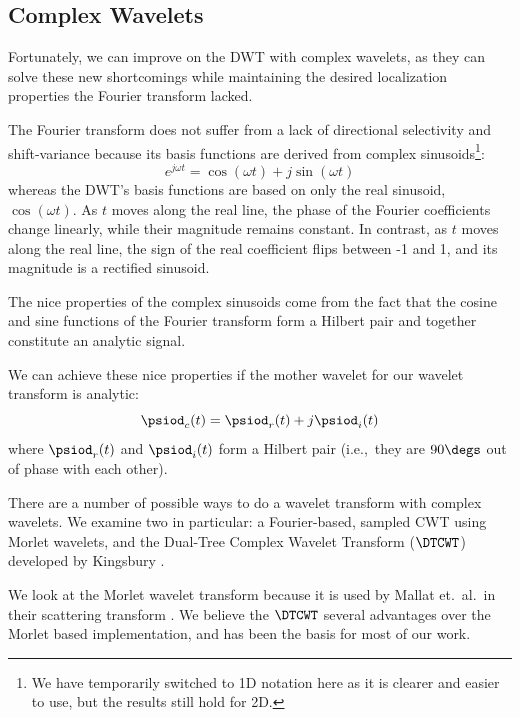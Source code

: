 \subsection{Complex Wavelets}\label{sec:ch2:complex_wavelets}
  Fortunately, we can improve on the DWT with complex wavelets, as they can
  solve these new shortcomings while maintaining the desired localization
  properties the Fourier transform lacked.

  The Fourier transform does not suffer from a lack of directional selectivity
  and shift-variance because its basis functions are derived from complex
  sinusoids\footnote{We have temporarily switched to 1D
  notation here as it is clearer and easier to use, but the results still hold
  for 2D.}:
  \begin{equation}
    e^{j\omega t} = \cos(\omega t) + j\sin(\omega t)
  \end{equation}
  whereas the DWT's basis functions are based on only the real
  sinusoid, $\cos(\omega t)$. As $t$ moves along the real line, the phase of the
  Fourier coefficients change linearly, while their magnitude remains constant. In
  contrast, as $t$ moves along the real line, the sign of the real coefficient
  flips between -1 and 1, and its magnitude is a rectified sinusoid.

  The nice properties of the complex sinusoids come from the fact that the
  cosine and sine functions of the Fourier transform form a Hilbert pair and
  together constitute an analytic signal.

  We can achieve these nice properties if the mother wavelet for our wavelet
  transform is analytic:
  \begin{equation}
    \psiod_{c}(t) = \psiod_{r}(t) + j\psiod_{i}(t) \label{eq:ch2:complex_wavelet}
  \end{equation}
  where $\psiod_{r}(t)$ and $\psiod_{i}(t)$ form a Hilbert pair (i.e.,\ they are
  $90\degs$ out of phase with each other).

  There are a number of possible ways to do a wavelet transform with complex
  wavelets. We examine two in particular: a Fourier-based, sampled CWT using
  Morlet wavelets, and the Dual-Tree Complex Wavelet Transform ($\DTCWT$)
  developed by Kingsbury \cite{kingsbury_wavelet_1997, kingsbury_dual-tree_1998,
  kingsbury_dual-tree_1998-1,  kingsbury_image_1999, kingsbury_shift_1999,
  kingsbury_dual-tree_2000, kingsbury_complex_2001, selesnick_dual-tree_2005}.

  We look at the Morlet wavelet transform because it is used by
  Mallat et.\ al.\ in their scattering transform
  \cite{bruna_classification_2011, bruna_invariant_2013, bruna_scattering_2013,
  oyallon_generic_2013, oyallon_deep_2015, sifre_rotation_2013,
  sifre_rigid-motion_2014, sifre_rigid-motion_2014-1, sifre_scatnet_2013}.
  We believe the $\DTCWT$
  several advantages over the Morlet based implementation, and has been the
  basis for most of our work.

